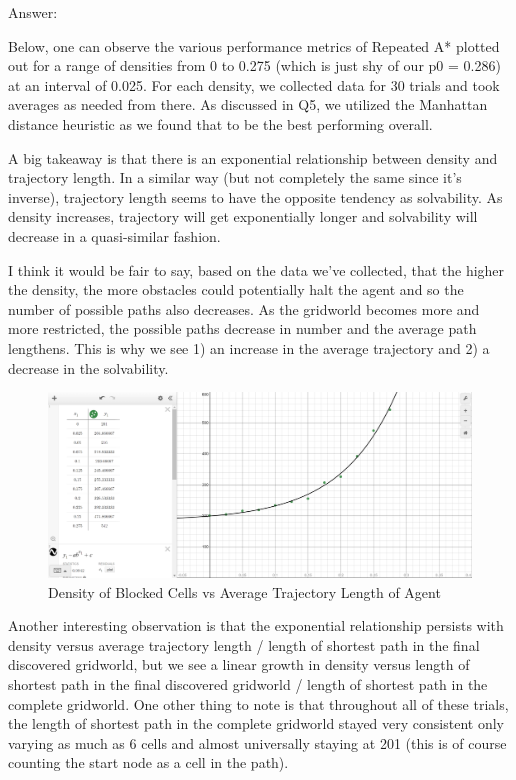 \documentclass{homeworg}
\begin{document}
Answer:

Below, one can observe the various performance metrics of Repeated A* plotted out for a range of densities from 0 to 0.275 (which is just shy of our p0 = 0.286) at an interval of 0.025. For each density, we collected data for 30 trials and took averages as needed from there. As discussed in Q5, we utilized the Manhattan distance heuristic as we found that to be the best performing overall.

A big takeaway is that there is an exponential relationship between density and trajectory length. In a similar way (but not completely the same since it's inverse), trajectory length seems to have the opposite tendency as solvability. As density increases, trajectory will get exponentially longer and solvability will decrease in a quasi-similar fashion. 

I think it would be fair to say, based on the data we've collected, that the higher the density, the more obstacles could potentially halt the agent and so the number of possible paths also decreases. As the gridworld becomes more and more restricted, the possible paths decrease in number and the average path lengthens. This is why we see 1) an increase in the average trajectory and 2) a decrease in the solvability.

\begin{figure}[h]
  	\centering
  	\includegraphics*[scale=0.3]{Q6 Density vs Avg Trajectory Length.png}
	\caption{Density of Blocked Cells vs Average Trajectory Length of Agent}
	\label{fig:example}
\end{figure}

Another interesting observation is that the exponential relationship persists with density versus average trajectory length / length of shortest path in the final discovered gridworld, but we see a linear growth in density versus length of shortest path in the final discovered gridworld / length of shortest path in the complete gridworld. One other thing to note is that throughout all of these trials, the length of shortest path in the complete gridworld stayed very consistent only varying as much as 6 cells and almost universally staying at 201 (this is of course counting the start node as a cell in the path).
\end{document}
